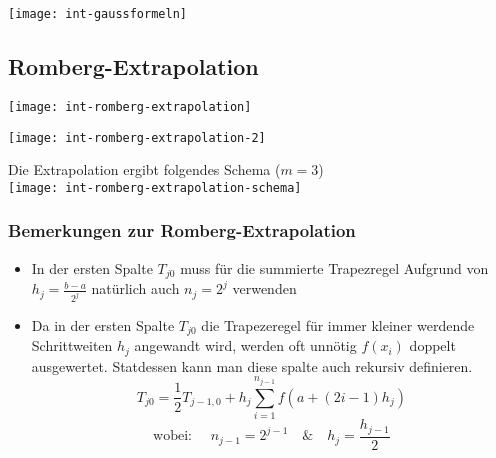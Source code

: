 \texttt{[image: int-gaussformeln]}






\subsection{Romberg-Extrapolation}

\texttt{[image: int-romberg-extrapolation]}

\texttt{[image: int-romberg-extrapolation-2]}

{\Large Die Extrapolation ergibt folgendes Schema ($m = 3$)}\\
\texttt{[image: int-romberg-extrapolation-schema]}


\subsubsection{Bemerkungen zur Romberg-Extrapolation}

\begin{itemize}
	\item In der ersten Spalte $T_{j0}$ muss für die summierte Trapezregel Aufgrund
	      von $h_j = \frac{b-a}{2^j}$ natürlich auch $n_j = 2^j$ verwenden
	\item Da in der ersten Spalte $T_{j0}$ die Trapezeregel für immer kleiner
	      werdende Schrittweiten $h_j$ angewandt wird, werden oft unnötig $f(x_i)$
	      doppelt ausgewertet. Statdessen kann man diese spalte auch rekursiv definieren.
          $$T_{j0} = \frac{1}{2} T_{j-1,0} + h_j \sum_{i=1}^{n_{j-1}} f(a + (2i-1)h_j)$$
          $$\text{wobei: } \quad n_{j-1} = 2^{j-1} \quad \& \quad h_j = \frac{h_{j-1}}{2}$$
\end{itemize}



